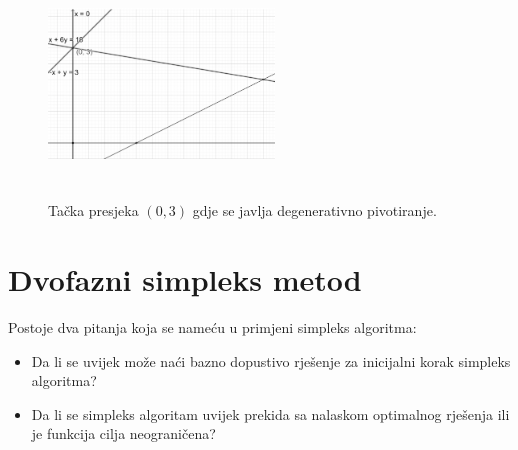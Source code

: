 \documentclass[a4paper, utf8, 11pt, colorlinks]{book}
\begin{document}
\begin{figure}[!ht]
	\centering
	\includegraphics[width=170pt,height=170pt]{deg-sol.eps}
	\caption{Tačka presjeka $(0,3)$ gdje se javlja degenerativno pivotiranje.}
	\label{fig:deg-sol}
\end{figure}

 \section{Dvofazni simpleks metod}
 Postoje dva pitanja koja se nameću u primjeni simpleks algoritma:
 \begin{itemize}
     \item Da li se uvijek može naći bazno dopustivo rješenje za inicijalni korak 
     simpleks algoritma?
     \item Da li se simpleks algoritam uvijek prekida sa nalaskom optimalnog rješenja ili je funkcija cilja neograničena?
 \end{itemize}
 
\end{document}
